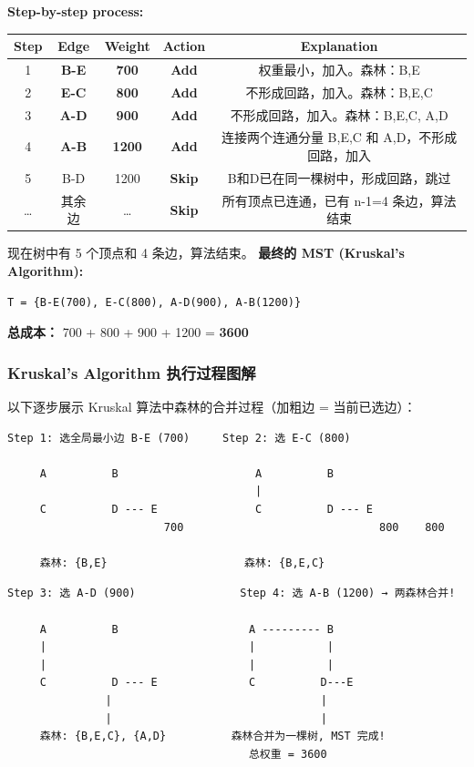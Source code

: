 \documentclass[10pt,a4paper,openany]{ctexbook}
\theoremstyle{definition}
\theoremstyle{remark}
\begin{document}
\textbf{Step-by-step process:}
\begin{center}
\begin{tabular}{ccccc}
\hline
Step & Edge & Weight & Action & Explanation \\ \hline
1 & \textbf{B-E} & \textbf{700} & \textbf{Add} & 权重最小，加入。森林：{B,E} \\
2 & \textbf{E-C} & \textbf{800} & \textbf{Add} & 不形成回路，加入。森林：{B,E,C} \\
3 & \textbf{A-D} & \textbf{900} & \textbf{Add} & 不形成回路，加入。森林：{B,E,C}, {A,D} \\
4 & \textbf{A-B} & \textbf{1200} & \textbf{Add} & 连接两个连通分量 {B,E,C} 和 {A,D}，不形成回路，加入 \\
5 & B-D & 1200 & \textbf{Skip} & B和D已在同一棵树中，形成回路，跳过 \\
… & 其余边 & … & \textbf{Skip} & 所有顶点已连通，已有 n-1=4 条边，算法结束 \\
\hline
\end{tabular}

\end{center}

现在树中有 5 个顶点和 4 条边，算法结束。
\textbf{最终的 MST (Kruskal's Algorithm):}
{\footnotesize\begin{verbatim}
T = {B-E(700), E-C(800), A-D(900), A-B(1200)}
\end{verbatim}}

\textbf{总成本：} 700 + 800 + 900 + 1200 = \textbf{3600}
\subsubsection{Kruskal's Algorithm 执行过程图解}

以下逐步展示 Kruskal 算法中森林的合并过程（加粗边 = 当前已选边）：
{\footnotesize\begin{verbatim}
Step 1: 选全局最小边 B-E (700)     Step 2: 选 E-C (800)

     A          B                     A          B
                                      |
     C          D --- E               C          D --- E
                        700                              800    800
                                                                   
     森林: {B,E}                     森林: {B,E,C}
\end{verbatim}}

{\footnotesize\begin{verbatim}
Step 3: 选 A-D (900)                Step 4: 选 A-B (1200) → 两森林合并!

     A          B                    A --------- B
     |                               |           |
     |                               |           |
     C          D --- E              C          D---E
               |                                |
               |                                |
     森林: {B,E,C}, {A,D}          森林合并为一棵树, MST 完成!
                                     总权重 = 3600
\end{verbatim}}
\end{document}
